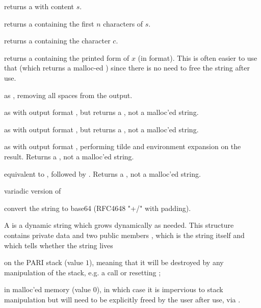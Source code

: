 
 returns a  with content $s$.

returns a  containing the first $n$ characters of $s$.

 returns a  containing the character
$c$.

 returns a  containing the printed
form of $x$ (in  format). This is often easier to use that
 (which returns a malloc-ed ) since there is no need
to free the string after use.

 as , removing all
spaces from the output.

 as  with output format ,
but returns a , not a malloc'ed string.

 as  with output format ,
but returns a , not a malloc'ed string.

 as  with output format ,
performing tilde and environment expansion on the result. Returns a
, not a malloc'ed string.

 equivalent to
, followed by . Returns a ,
not a malloc'ed string.

 variadic version of

 convert the string to base64 (RFC4648
"+/" with padding).


A  is a dynamic string which grows dynamically as needed.
This structure contains private data and two public members ,
which is the string itself and  which tells whether the
string lives

\item on the PARI stack (value $1$), meaning that it will be destroyed by any
manipulation of the stack, e.g. a  call or resetting
;

\item in malloc'ed memory (value $0$), in which case it is impervious to
stack manipulation but will need to be explicitly freed by the user
after use, via .


